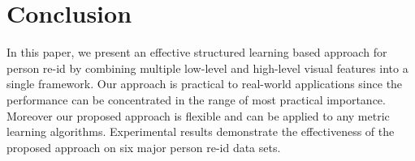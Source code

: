 \documentclass[10pt,twocolumn,letterpaper]{article}
\begin{document}
%
\section{Conclusion}
%
%
In this paper, we present an effective structured learning based
approach for person
re-id by combining multiple low-level and high-level
visual features into a single framework.
Our approach is practical to real-world applications
since the performance can be concentrated in the range of
most practical importance.
Moreover our proposed approach is  flexible and can be applied
to any metric learning algorithms.
Experimental results demonstrate the effectiveness of the
proposed approach on six major person re-id data sets.
%
%
%
%
%
%
%
%
%
%

%
%
%



{\small


}
\end{document}

